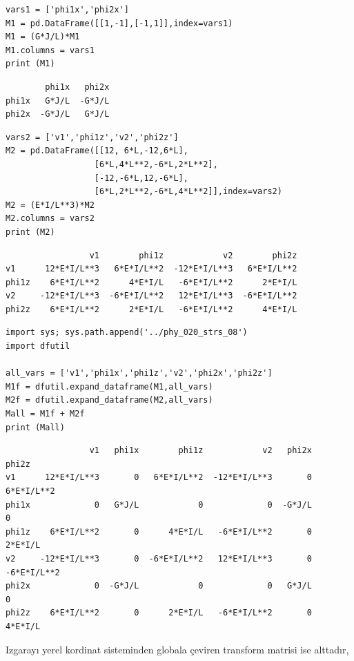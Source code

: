 \documentclass[12pt,fleqn]{article}\usepackage{../../common}
\begin{document}
\begin{verbatim}
vars1 = ['phi1x','phi2x']
M1 = pd.DataFrame([[1,-1],[-1,1]],index=vars1)
M1 = (G*J/L)*M1
M1.columns = vars1
print (M1)
\end{verbatim}

\begin{verbatim}
        phi1x   phi2x
phi1x   G*J/L  -G*J/L
phi2x  -G*J/L   G*J/L
\end{verbatim}

\begin{verbatim}
vars2 = ['v1','phi1z','v2','phi2z']
M2 = pd.DataFrame([[12, 6*L,-12,6*L],
                  [6*L,4*L**2,-6*L,2*L**2],
                  [-12,-6*L,12,-6*L],
                  [6*L,2*L**2,-6*L,4*L**2]],index=vars2)
M2 = (E*I/L**3)*M2
M2.columns = vars2
print (M2)
\end{verbatim}

\begin{verbatim}
                 v1        phi1z            v2        phi2z
v1      12*E*I/L**3   6*E*I/L**2  -12*E*I/L**3   6*E*I/L**2
phi1z    6*E*I/L**2      4*E*I/L   -6*E*I/L**2      2*E*I/L
v2     -12*E*I/L**3  -6*E*I/L**2   12*E*I/L**3  -6*E*I/L**2
phi2z    6*E*I/L**2      2*E*I/L   -6*E*I/L**2      4*E*I/L
\end{verbatim}

\begin{verbatim}
import sys; sys.path.append('../phy_020_strs_08')
import dfutil

all_vars = ['v1','phi1x','phi1z','v2','phi2x','phi2z']
M1f = dfutil.expand_dataframe(M1,all_vars)
M2f = dfutil.expand_dataframe(M2,all_vars)
Mall = M1f + M2f
print (Mall)
\end{verbatim}

\begin{verbatim}
                 v1   phi1x        phi1z            v2   phi2x        phi2z
v1      12*E*I/L**3       0   6*E*I/L**2  -12*E*I/L**3       0   6*E*I/L**2
phi1x             0   G*J/L            0             0  -G*J/L            0
phi1z    6*E*I/L**2       0      4*E*I/L   -6*E*I/L**2       0      2*E*I/L
v2     -12*E*I/L**3       0  -6*E*I/L**2   12*E*I/L**3       0  -6*E*I/L**2
phi2x             0  -G*J/L            0             0   G*J/L            0
phi2z    6*E*I/L**2       0      2*E*I/L   -6*E*I/L**2       0      4*E*I/L
\end{verbatim}

Izgarayı yerel kordinat sisteminden globala çeviren transform matrisi ise
alttadır,
\end{document}
